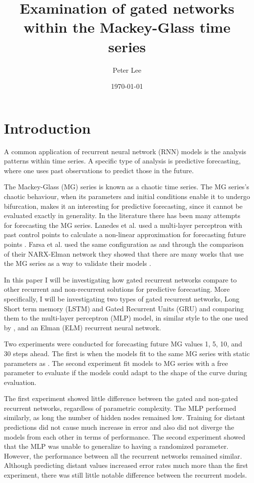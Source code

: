 \documentclass[11pt]{article}
\author{Peter Lee}
\date{\today}
\title{Examination of gated networks within the Mackey-Glass time series}
\begin{document}
\maketitle

\section{Introduction}
A common application of recurrent neural network (RNN) models is the
analysis patterns within time series. A specific
type of analysis is predictive forecasting, where one uses past
observations to predict those in the future. 

The Mackey-Glass (MG) series\cite{MG} is known as a chaotic time series.
The MG series's chaotic behaviour, when its parameters and initial
conditions enable it to undergo bifurcation, makes it an interesting
for predictive forecasting, since it cannot be evaluated exactly
in generality. In the literature there has been many attempts for forecasting the MG
series. Lanedes et al. used a multi-layer perceptron with past control
points to calculate a non-linear approximation for forecasting future
points \cite{tr}. Farsa et al. used the same configuration as
\cite{tr} and through the comparison of their NARX-Elman network they showed
that there are many works that use the MG series as a way to validate
their models \cite{Farsa}.

In this paper I will be investigating how gated recurrent networks
compare to other recurrent and non-recurrent solutions for predictive
forecasting. More specifically, I will be investigating two types of
gated recurrent networks, Long Short term memory (LSTM) \cite{LSTM}
and Gated Recurrent Units (GRU) \cite{GRU} and comparing them to the
multi-layer perceptron (MLP) model, in similar style to the one used by \cite{tr}, and an
Elman (ELM) recurrent neural network.

Two experiments were conducted for forecasting future MG values 1, 5,
10, and 30 steps ahead. The first is when the models fit to the same MG series with static parameters as \cite{tr,Farsa}. The second experiment fit models to MG series with
a free parameter to evaluate if the models could adapt to the shape of
the curve during evaluation. 

The first experiment showed little difference between the gated and
non-gated recurrent networks, regardless of parametric complexity. The
MLP performed similarly, as long the number of hidden nodes
remained low. Training for distant predictions did not cause much
increase in error and also did not diverge the
models from each other in terms of performance. The second experiment showed that the MLP was unable to generalize to
having a randomized parameter. However, the performance between all the
recurrent networks remained similar. Although predicting distant
values increased error rates much more than the first experiment,
there was still little notable difference between the recurrent
models.
\end{document}
